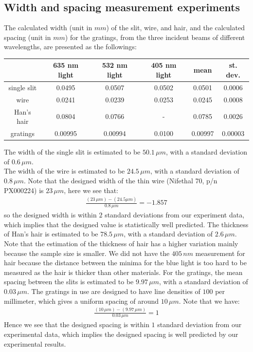 \documentclass[11pt]{book}
\theoremstyle{break}
\theoremstyle{break}
\begin{document}
\subsection{Width and spacing measurement experiments}
The calculated width (unit in $mm$) of the slit, wire, and hair, and the calculated spacing (unit in $mm$) for the gratings, from the three incident beams of different wavelengths, are presented as the followings:
\begin{center}
\begin{tabular}{|c|c|c|c|c|c|}
\hline
 & 635 nm light & 532 nm light & 405 nm light & mean & st. dev.\\
\hline
single slit & 0.0495 & 0.0507 & 0.0502 & 0.0501 & 0.0006\\
\hline
wire & 0.0241 & 0.0239 & 0.0253 & 0.0245 & 0.0008\\
\hline
Han's hair & 0.0804 & 0.0766 & - & 0.0785 & 0.0026 \\
\hline
gratings & 0.00995 & 0.00994 & 0.0100 & 0.00997 &  0.00003\\
\hline
\end{tabular}
\end{center}
The width of the single slit is estimated to be $50.1\, \mu m$, with a standard deviation of $0.6\, \mu m$. \\
The width of the wire is estimated to be $24.5\, \mu m$, with a standard deviation of $0.8\, \mu m$. Note that the designed width of the thin wire (Nifethal 70, p/n PX000224) is $23\, \mu m$, here we see that:
\begin{align*}
\frac{(23\, \mu m)-(24.5\mu m)}{0.8\,\mu m} = -1.857
\end{align*}
so the designed width is within $2$ standard deviations from our experiment data, which implies that the designed value is statistically well predicted. The thickness of Han's hair is estimated to be $78.5\, \mu m$, with a standard deviation of $2.6\, \mu m$. Note that the estimation of the thickness of hair has a higher variation mainly because the sample size is smaller. We did not have the $405\, nm$
measurement for hair because the distance between the minima for the blue light is too hard to be measured as the hair is thicker than other materials. For the gratings, the mean spacing between the slits is estimated to be $9.97\, \mu m$, with a standard deviation of $0.03\,\mu m$. The gratings in use are designed to have line densities of $100$ per millimeter, which gives a uniform spacing of around $10\, \mu m$. Note that we have:\begin{align*}
\frac{(10\,\mu m )- (9.97\, \mu m)}{0.03\,\mu m} = 1
\end{align*}
Hence we see that the designed spacing is within $1$ standard deviation from our experimental data, which implies the designed spacing is well predicted by our experimental results.\\
\end{document}
